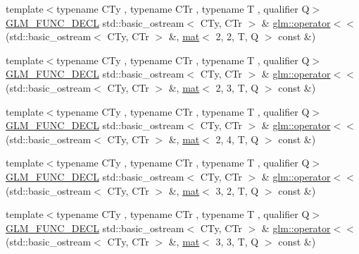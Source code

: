 \begin{DoxyCompactItemize}
\item 
{\footnotesize template$<$typename C\+Ty , typename C\+Tr , typename T , qualifier Q$>$ }\\\mbox{\hyperlink{setup_8hpp_ab2d052de21a70539923e9bcbf6e83a51}{G\+L\+M\+\_\+\+F\+U\+N\+C\+\_\+\+D\+E\+CL}} std\+::basic\+\_\+ostream$<$ C\+Ty, C\+Tr $>$ \& \mbox{\hyperlink{group__gtx__io_ga9793fc7111cd7d145c369827071f5091}{glm\+::operator$<$$<$}} (std\+::basic\+\_\+ostream$<$ C\+Ty, C\+Tr $>$ \&, \mbox{\hyperlink{structglm_1_1mat}{mat}}$<$ 2, 2, T, Q $>$ const \&)
\item 
{\footnotesize template$<$typename C\+Ty , typename C\+Tr , typename T , qualifier Q$>$ }\\\mbox{\hyperlink{setup_8hpp_ab2d052de21a70539923e9bcbf6e83a51}{G\+L\+M\+\_\+\+F\+U\+N\+C\+\_\+\+D\+E\+CL}} std\+::basic\+\_\+ostream$<$ C\+Ty, C\+Tr $>$ \& \mbox{\hyperlink{group__gtx__io_ga2bf4942715dc303be4a8752a44adce55}{glm\+::operator$<$$<$}} (std\+::basic\+\_\+ostream$<$ C\+Ty, C\+Tr $>$ \&, \mbox{\hyperlink{structglm_1_1mat}{mat}}$<$ 2, 3, T, Q $>$ const \&)
\item 
{\footnotesize template$<$typename C\+Ty , typename C\+Tr , typename T , qualifier Q$>$ }\\\mbox{\hyperlink{setup_8hpp_ab2d052de21a70539923e9bcbf6e83a51}{G\+L\+M\+\_\+\+F\+U\+N\+C\+\_\+\+D\+E\+CL}} std\+::basic\+\_\+ostream$<$ C\+Ty, C\+Tr $>$ \& \mbox{\hyperlink{group__gtx__io_ga79ad9284d3311aad760f84621197c972}{glm\+::operator$<$$<$}} (std\+::basic\+\_\+ostream$<$ C\+Ty, C\+Tr $>$ \&, \mbox{\hyperlink{structglm_1_1mat}{mat}}$<$ 2, 4, T, Q $>$ const \&)
\item 
{\footnotesize template$<$typename C\+Ty , typename C\+Tr , typename T , qualifier Q$>$ }\\\mbox{\hyperlink{setup_8hpp_ab2d052de21a70539923e9bcbf6e83a51}{G\+L\+M\+\_\+\+F\+U\+N\+C\+\_\+\+D\+E\+CL}} std\+::basic\+\_\+ostream$<$ C\+Ty, C\+Tr $>$ \& \mbox{\hyperlink{group__gtx__io_gacd6666708d198e61ac99b5b144aafdf1}{glm\+::operator$<$$<$}} (std\+::basic\+\_\+ostream$<$ C\+Ty, C\+Tr $>$ \&, \mbox{\hyperlink{structglm_1_1mat}{mat}}$<$ 3, 2, T, Q $>$ const \&)
\item 
{\footnotesize template$<$typename C\+Ty , typename C\+Tr , typename T , qualifier Q$>$ }\\\mbox{\hyperlink{setup_8hpp_ab2d052de21a70539923e9bcbf6e83a51}{G\+L\+M\+\_\+\+F\+U\+N\+C\+\_\+\+D\+E\+CL}} std\+::basic\+\_\+ostream$<$ C\+Ty, C\+Tr $>$ \& \mbox{\hyperlink{group__gtx__io_ga4de3d5bb444fa0ef69608fc068e27d0e}{glm\+::operator$<$$<$}} (std\+::basic\+\_\+ostream$<$ C\+Ty, C\+Tr $>$ \&, \mbox{\hyperlink{structglm_1_1mat}{mat}}$<$ 3, 3, T, Q $>$ const \&)

\end{DoxyCompactItemize}
